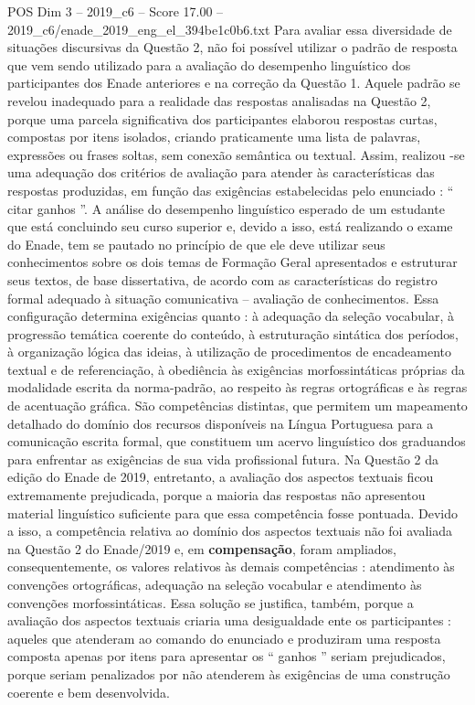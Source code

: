 \begin{textsample}{POS Dim 3 – 2019\_c6 – Score 17.00 – 2019\_c6/enade\_2019\_eng\_el\_394be1c0b6.txt}
Para avaliar essa diversidade de situações discursivas da Questão 2, não foi possível utilizar o padrão de resposta que vem sendo utilizado para a avaliação do desempenho linguístico dos participantes dos Enade anteriores e na correção da Questão 1.
Aquele padrão se revelou inadequado para a realidade das respostas analisadas na Questão 2, porque uma parcela significativa dos participantes elaborou respostas curtas, compostas por itens isolados, criando praticamente uma lista de palavras, expressões ou frases soltas, sem conexão semântica ou textual.
Assim, realizou -se uma adequação dos critérios de avaliação para atender às características das respostas produzidas, em função das exigências estabelecidas pelo enunciado : “ citar ganhos ”.
A análise do desempenho linguístico esperado de um estudante que está concluindo seu curso superior e, devido a isso, está realizando o exame do Enade, tem se pautado no princípio de que ele deve utilizar seus conhecimentos sobre os dois temas de Formação Geral apresentados e estruturar seus textos, de base dissertativa, de acordo com as características do registro formal adequado à situação comunicativa – avaliação de conhecimentos.
Essa configuração determina exigências quanto : à adequação da seleção vocabular, à progressão temática coerente do conteúdo, à estruturação sintática dos períodos, à organização lógica das ideias, à utilização de procedimentos de encadeamento textual e de referenciação, à obediência às exigências morfossintáticas próprias da modalidade escrita da norma-padrão, ao respeito às regras ortográficas e às regras de acentuação gráfica.
São competências distintas, que permitem um mapeamento detalhado do domínio dos recursos disponíveis na Língua Portuguesa para a comunicação escrita formal, que constituem um acervo linguístico dos graduandos para enfrentar as exigências de sua vida profissional futura.
Na Questão 2 da edição do Enade de 2019, entretanto, a avaliação dos aspectos textuais ficou extremamente prejudicada, porque a maioria das respostas não apresentou material linguístico suficiente para que essa competência fosse pontuada.
Devido a isso, a competência relativa ao domínio dos aspectos textuais não foi avaliada na Questão 2 do Enade/2019 e, em \textbf{compensação}, foram ampliados, consequentemente, os valores relativos às demais competências : atendimento às convenções ortográficas, adequação na seleção vocabular e atendimento às convenções morfossintáticas.
Essa solução se justifica, também, porque a avaliação dos aspectos textuais criaria uma desigualdade ente os participantes : aqueles que atenderam ao comando do enunciado e produziram uma resposta composta apenas por itens para apresentar os “ ganhos ” seriam prejudicados, porque seriam penalizados por não atenderem às exigências de uma construção coerente e bem desenvolvida.

\end{textsample}
